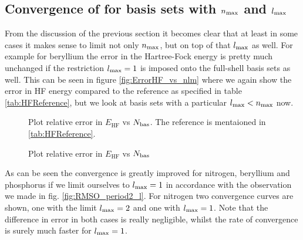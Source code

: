 
\subsection{Convergence of \HF for \CS basis sets with $n_\text{max}$ and $l_\text{max}$}


From the discussion of the previous section
it becomes clear that at least in some cases it makes sense to
limit not only $n_\text{max}$, but on top of that $l_\text{max}$ as well.
For example for beryllium the error
in the Hartree-Fock energy is pretty much unchanged if the
restriction $l_\text{max} = 1$ is imposed onto the full-shell \CS basis sets as well.
This can be seen in figure \vref{fig:ErrorHF_vs_nlm}
where we again show the error in HF energy compared to the reference
as specified in table \vref{tab:HFReference},
but we look at basis sets with a particular $l_\text{max} < n_\text{max}$ now.

\begin{figure}
	\centering
	\caption{Plot relative error in $E_\text{HF}$ vs $N_\text{bas}$.
		The reference is mentaioned in \vref{tab:HFReference}.}
	\label{fig:ErrorHF_vs_nlm}
\end{figure}


\begin{figure}
	\centering
	\caption{Plot relative error in $E_\text{HF}$ vs $N_\text{bas}$}
	\label{fig:ErrorHF_vs_nlm_O}
\end{figure}

As can be seen the convergence is greatly improved
for nitrogen, beryllium and phosphorus
if we limit ourselves to $l_\text{max} = 1$
in accordance with the observation we made in fig.
\vref{fig:RMSO_period2_l}.
For nitrogen two convergence curves are shown,
one with the limit $l_\text{max} = 2$ and one with $l_\text{max} = 1$.
Note that the difference in \HF error in both cases
is really negligible, whilst the rate of convergence is
surely much faster for $l_\text{max} = 1$.

